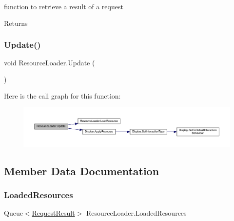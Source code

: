 function to retrieve a result of a request 

\begin{DoxyReturn}{Returns}

\end{DoxyReturn}
\mbox{\label{class_resource_loader_a20a1036648a453863c96b51d33edfa11}} 
\subsubsection{\texorpdfstring{Update()}{Update()}}
{\footnotesize\ttfamily void Resource\+Loader.\+Update (\begin{DoxyParamCaption}{ }\end{DoxyParamCaption})\hspace{0.3cm}{\ttfamily [private]}}

Here is the call graph for this function\+:
\nopagebreak
\begin{figure}[H]
\begin{center}
\leavevmode
\includegraphics[width=350pt]{class_resource_loader_a20a1036648a453863c96b51d33edfa11_cgraph}
\end{center}
\end{figure}


\subsection{Member Data Documentation}
\mbox{\label{class_resource_loader_aac461f634dc821609293616d32e7288e}} 
\subsubsection{\texorpdfstring{Loaded\+Resources}{LoadedResources}}
{\footnotesize\ttfamily Queue$<$\mbox{\hyperlink{struct_resource_loader_1_1_request_result}{Request\+Result}}$>$ Resource\+Loader.\+Loaded\+Resources\hspace{0.3cm}{\ttfamily [private]}}

